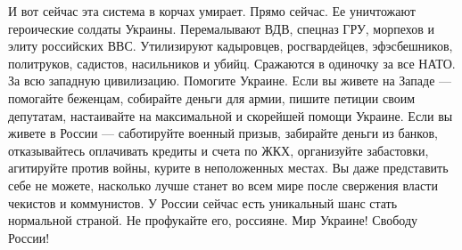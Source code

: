И вот сейчас эта система в корчах умирает. Прямо сейчас. Ее уничтожают героические солдаты Украины. Перемалывают ВДВ, спецназ ГРУ, морпехов и элиту российских ВВС. Утилизируют кадыровцев, росгвардейцев, эфэсбешников, политруков, садистов, насильников и убийц. Сражаются в одиночку за все НАТО. За всю западную цивилизацию. Помогите Украине. Если вы живете на Западе — помогайте беженцам, собирайте деньги для армии, пишите петиции своим депутатам, настаивайте на максимальной и скорейшей помощи Украине. Если вы живете в России — саботируйте военный призыв, забирайте деньги из банков, отказывайтесь оплачивать кредиты и счета по ЖКХ, организуйте забастовки, агитируйте против войны, курите в неположенных местах.
Вы даже представить себе не можете, насколько лучше станет во всем мире после свержения власти чекистов и коммунистов.
У России сейчас есть уникальный шанс стать нормальной страной. Не профукайте его, россияне.
Мир Украине!
Свободу России!
